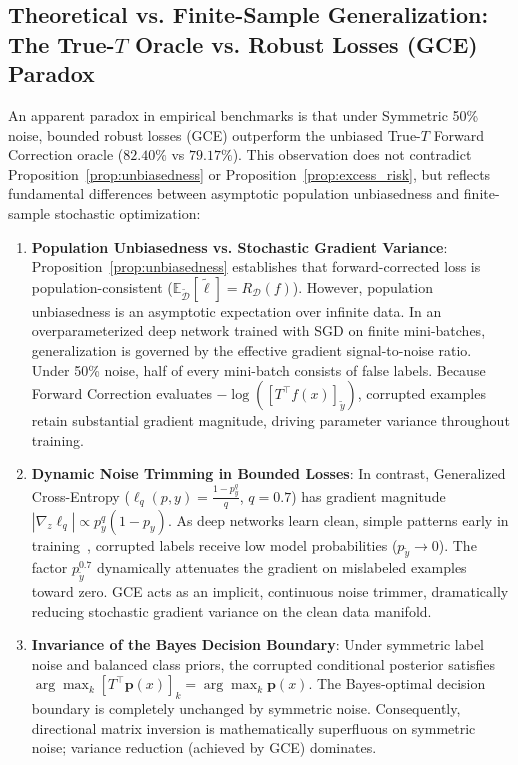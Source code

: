 \documentclass[10pt,twocolumn]{article}
\theoremstyle{definition}
\begin{document}
\subsection{Theoretical vs. Finite-Sample Generalization: The \texorpdfstring{True-$T$}{True-T} Oracle vs. Robust Losses (GCE) Paradox}
\label{sec:true_t_vs_gce_theory}
An apparent paradox in empirical benchmarks is that under Symmetric 50\% noise, bounded robust losses (GCE) outperform the unbiased True-$T$ Forward Correction oracle ($82.40\%$ vs $79.17\%$). This observation does not contradict Proposition~\ref{prop:unbiasedness} or Proposition~\ref{prop:excess_risk}, but reflects fundamental differences between asymptotic population unbiasedness and finite-sample stochastic optimization:
\begin{enumerate}
    \item \textbf{Population Unbiasedness vs. Stochastic Gradient Variance}: Proposition~\ref{prop:unbiasedness} establishes that forward-corrected loss is population-consistent ($\mathbb{E}_{\tilde{\mathcal{D}}}[\tilde{\ell}] = R_{\mathcal{D}}(f)$). However, population unbiasedness is an asymptotic expectation over infinite data. In an overparameterized deep network trained with SGD on finite mini-batches, generalization is governed by the effective gradient signal-to-noise ratio. Under 50\% noise, half of every mini-batch consists of false labels. Because Forward Correction evaluates $-\log([T^\top f(x)]_{\tilde{y}})$, corrupted examples retain substantial gradient magnitude, driving parameter variance throughout training.
    \item \textbf{Dynamic Noise Trimming in Bounded Losses}: In contrast, Generalized Cross-Entropy ($\ell_q(p, y) = \frac{1 - p_y^q}{q}$, $q=0.7$) has gradient magnitude $|\nabla_z \ell_q| \propto p_y^q (1 - p_y)$. As deep networks learn clean, simple patterns early in training~\cite{arpit2017closer}, corrupted labels receive low model probabilities ($p_{\tilde{y}} \to 0$). The factor $p_{\tilde{y}}^{0.7}$ dynamically attenuates the gradient on mislabeled examples toward zero. GCE acts as an implicit, continuous noise trimmer, dramatically reducing stochastic gradient variance on the clean data manifold.
    \item \textbf{Invariance of the Bayes Decision Boundary}: Under symmetric label noise and balanced class priors, the corrupted conditional posterior satisfies $\arg\max_k [T^\top \mathbf{p}(x)]_k = \arg\max_k \mathbf{p}(x)$. The Bayes-optimal decision boundary is completely unchanged by symmetric noise. Consequently, directional matrix inversion is mathematically superfluous on symmetric noise; variance reduction (achieved by GCE) dominates.

\end{enumerate}
\end{document}
